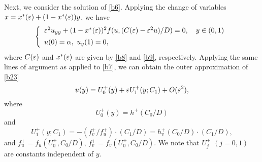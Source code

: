 \documentclass[a4,10pt]{article}
\begin{document}
Next, we consider the solution of \eqref{b6}.
Applying the change of variables $x = x^*(\varepsilon) + (1-x^*(\varepsilon))y$, we have
%
\begin{equation}\label{b23}
\left \{
\begin{array}{l}
\ep^2 u_{yy} + (1- x^*(\ep))^2 f( u,  (C(\ep) - \ep^2 u )/D ) = 0, \ \ \ y \in (0, 1)   \\[1ex]
u(0) = \alpha, \ u_y(1) = 0, \ 
\end{array} 
\right.
\end{equation}
%
where $C(\varepsilon)$ and $x^*(\varepsilon)$ are given by \eqref{b8} and \eqref{b9}, respectively.
Applying the same lines of argument as applied to \eqref{b7}, 
we can obtain the outer approximation of \eqref{b23} 
%
\[%
u(y)  =  U^+_0(y) + \ep U^+_1(y;C_1) + O(\ep^2),
\]%
%
where
%
\begin{equation}\label{b25}
U^+_0(y) = h^{+}(C_0/D) 
\end{equation}
and
%
\begin{equation}\label{b26}
U^+_1(y;C_1) = - (f_v^+ / f_u^+) \cdot (C_1/D) = h^+_v(C_0/D) \cdot (C_1/D),
\end{equation}
%
%
and $f_u^+ = f_u( U^+_0, C_0/D)$, $f_v^+ = f_v( U^+_0, C_0/D)$.
We note that $U^+_j$ $(j=0, 1)$ are constants independent of $y$.
\end{document}
